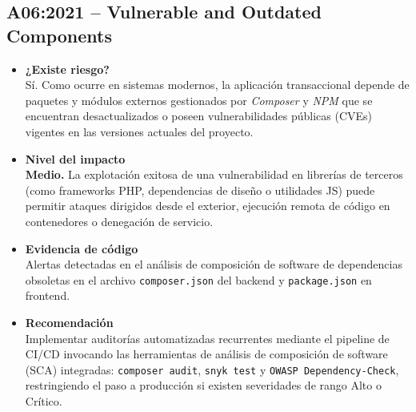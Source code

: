 \subsection{A06:2021 – Vulnerable and Outdated Components}

\begin{itemize}
    \item \textbf{¿Existe riesgo?} \\
    Sí. Como ocurre en sistemas modernos, la aplicación transaccional depende de paquetes y módulos externos gestionados por \textit{Composer} y \textit{NPM} que se encuentran desactualizados o poseen vulnerabilidades públicas (CVEs) vigentes en las versiones actuales del proyecto.
    
    \item \textbf{Nivel del impacto} \\
    \textbf{Medio.} La explotación exitosa de una vulnerabilidad en librerías de terceros (como frameworks PHP, dependencias de diseño o utilidades JS) puede permitir ataques dirigidos desde el exterior, ejecución remota de código en contenedores o denegación de servicio.
    
    \item \textbf{Evidencia de código} \\
    Alertas detectadas en el análisis de composición de software de dependencias obsoletas en el archivo \texttt{composer.json} del backend y \texttt{package.json} en frontend.
    
    \item \textbf{Recomendación} \\
    Implementar auditorías automatizadas recurrentes mediante el pipeline de CI/CD invocando las herramientas de análisis de composición de software (SCA) integradas: \texttt{composer audit}, \texttt{snyk test} y \texttt{OWASP Dependency-Check}, restringiendo el paso a producción si existen severidades de rango Alto o Crítico.
\end{itemize}
